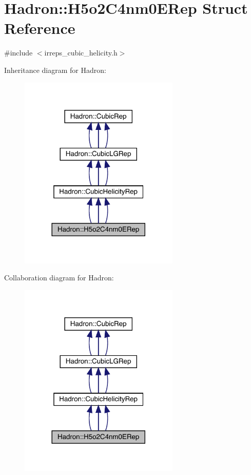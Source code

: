 \hypertarget{structHadron_1_1H5o2C4nm0ERep}{}\section{Hadron\+:\+:H5o2\+C4nm0\+E\+Rep Struct Reference}
\label{structHadron_1_1H5o2C4nm0ERep}


{\ttfamily \#include $<$irreps\+\_\+cubic\+\_\+helicity.\+h$>$}



Inheritance diagram for Hadron\+:
\nopagebreak
\begin{figure}[H]
\begin{center}
\leavevmode
\includegraphics[width=216pt]{d3/d8b/structHadron_1_1H5o2C4nm0ERep__inherit__graph}
\end{center}
\end{figure}


Collaboration diagram for Hadron\+:
\nopagebreak
\begin{figure}[H]
\begin{center}
\leavevmode
\includegraphics[width=216pt]{de/d94/structHadron_1_1H5o2C4nm0ERep__coll__graph}
\end{center}
\end{figure}
